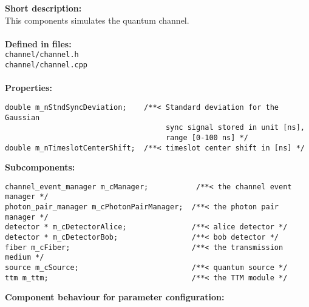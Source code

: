 \textbf{Short description:}\\
This components simulates the quantum channel. \\
\\
\textbf{Defined in files:}\\
\texttt{channel/channel.h}\\
\texttt{channel/channel.cpp}\\
\\
\textbf{Properties:}
\begin{lstlisting}
double m_nStndSyncDeviation;    /**< Standard deviation for the Gaussian
                                     sync signal stored in unit [ns], 
                                     range [0-100 ns] */
double m_nTimeslotCenterShift;  /**< timeslot center shift in [ns] */
\end{lstlisting}
\noindent
\textbf{Subcomponents:}
\begin{lstlisting}
channel_event_manager m_cManager;           /**< the channel event manager */
photon_pair_manager m_cPhotonPairManager;  /**< the photon pair manager */
detector * m_cDetectorAlice;               /**< alice detector */
detector * m_cDetectorBob;                 /**< bob detector */
fiber m_cFiber;                            /**< the transmission medium */
source m_cSource;                          /**< quantum source */
ttm m_ttm;                                 /**< the TTM module */
\end{lstlisting}
\noindent
\textbf{Component behaviour for parameter configuration:}
